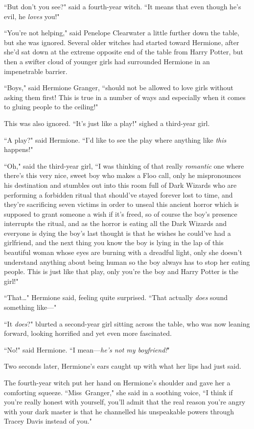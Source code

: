 ``But don't you see?" said a fourth-year witch. ``It means that even though he's evil, he \emph{loves} you!"

``You're not helping," said Penelope Clearwater a little further down the table, but she was ignored. Several older witches had started toward Hermione, after she'd sat down at the extreme opposite end of the table from Harry Potter, but then a swifter cloud of younger girls had surrounded Hermione in an impenetrable barrier.

``Boys," said Hermione Granger, ``should not be allowed to love girls without asking them first! This is true in a number of ways and especially when it comes to gluing people to the ceiling!"

This was also ignored. ``It's just like a play!" sighed a third-year girl.

``A play?" said Hermione. ``I'd like to see the play where anything like \emph{this} happens!"

``Oh," said the third-year girl, ``I was thinking of that really \emph{romantic} one where there's this very nice, sweet boy who makes a Floo call, only he mispronounces his destination and stumbles out into this room full of Dark Wizards who are performing a forbidden ritual that should've stayed forever lost to time, and they're sacrificing seven victims in order to unseal this ancient horror which is supposed to grant someone a wish if it's freed, so of course the boy's presence interrupts the ritual, and as the horror is eating all the Dark Wizards and everyone is dying the boy's last thought is that he wishes he could've had a girlfriend, and the next thing you know the boy is lying in the lap of this beautiful woman whose eyes are burning with a dreadful light, only she doesn't understand anything about being human so the boy always has to stop her eating people. This is just like that play, only you're the boy and Harry Potter is the girl!"

``That{\ldots}" Hermione said, feeling quite surprised. ``That actually \emph{does} sound something like—"

``It \emph{does}?" blurted a second-year girl sitting across the table, who was now leaning forward, looking horrified and yet even more fascinated.

``No!" said Hermione. ``I mean—\emph{he's not my boyfriend!}"

Two seconds later, Hermione's ears caught up with what her lips had just said.

The fourth-year witch put her hand on Hermione's shoulder and gave her a comforting squeeze. ``Miss~Granger," she said in a soothing voice, ``I think if you're really honest with yourself, you'll admit that the real reason you're angry with your dark master is that he channelled his unspeakable powers through Tracey Davis instead of you."

